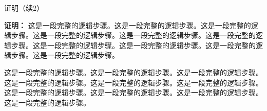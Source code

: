 \documentclass[aspectratio=169,10pt,fontset=fandol]{ctexbeamer}
\begin{document}
\begin{frame}[t,fragile]{证明（续2）}
\footnotesize
{\footnotesize
\textbf{证明：}
这是一段完整的逻辑步骤。这是一段完整的逻辑步骤。这是一段完整的逻辑步骤。这是一段完整的逻辑步骤。这是一段完整的逻辑步骤。这是一段完整的逻辑步骤。这是一段完整的逻辑步骤。这是一段完整的逻辑步骤。这是一段完整的逻辑步骤。这是一段完整的逻辑步骤。

这是一段完整的逻辑步骤。这是一段完整的逻辑步骤。这是一段完整的逻辑步骤。这是一段完整的逻辑步骤。这是一段完整的逻辑步骤。这是一段完整的逻辑步骤。这是一段完整的逻辑步骤。这是一段完整的逻辑步骤。这是一段完整的逻辑步骤。这是一段完整的逻辑步骤。
}
\end{frame}
\end{document}
